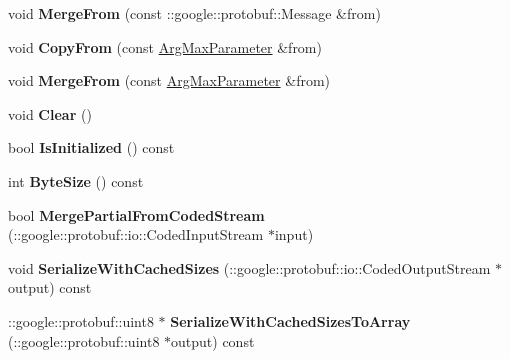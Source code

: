 \begin{DoxyCompactItemize}
void {\bfseries Merge\+From} (const \+::google\+::protobuf\+::\+Message \&from)
\item 
\mbox{\label{classcaffe_1_1_arg_max_parameter_a56ed9a318eeddcf5386abfdec9439544}} 
void {\bfseries Copy\+From} (const \mbox{\hyperlink{classcaffe_1_1_arg_max_parameter}{Arg\+Max\+Parameter}} \&from)
\item 
\mbox{\label{classcaffe_1_1_arg_max_parameter_a87101bad15e3d30d2a3f4bf088138f9d}} 
void {\bfseries Merge\+From} (const \mbox{\hyperlink{classcaffe_1_1_arg_max_parameter}{Arg\+Max\+Parameter}} \&from)
\item 
\mbox{\label{classcaffe_1_1_arg_max_parameter_ad0573348cf2f609ffb304905793e39c0}} 
void {\bfseries Clear} ()
\item 
\mbox{\label{classcaffe_1_1_arg_max_parameter_aa18d593f39d90bdf6890d0ef929998c4}} 
bool {\bfseries Is\+Initialized} () const
\item 
\mbox{\label{classcaffe_1_1_arg_max_parameter_aae2c222b3ee26d56e0896c87fc481633}} 
int {\bfseries Byte\+Size} () const
\item 
\mbox{\label{classcaffe_1_1_arg_max_parameter_a8c6e5d65aca437260295ff2d49d7e160}} 
bool {\bfseries Merge\+Partial\+From\+Coded\+Stream} (\+::google\+::protobuf\+::io\+::\+Coded\+Input\+Stream $\ast$input)
\item 
\mbox{\label{classcaffe_1_1_arg_max_parameter_a3bdc0ac5a1acabcb3a08b254ff810cdd}} 
void {\bfseries Serialize\+With\+Cached\+Sizes} (\+::google\+::protobuf\+::io\+::\+Coded\+Output\+Stream $\ast$output) const
\item 
\mbox{\label{classcaffe_1_1_arg_max_parameter_a6409754428aab391c4b1c3459a2483ed}} 
\+::google\+::protobuf\+::uint8 $\ast$ {\bfseries Serialize\+With\+Cached\+Sizes\+To\+Array} (\+::google\+::protobuf\+::uint8 $\ast$output) const
\item 
\mbox{\label{classcaffe_1_1_arg_max_parameter_a11a6ef12e2ed3becd44b8829022122f4}} 

\end{DoxyCompactItemize}
